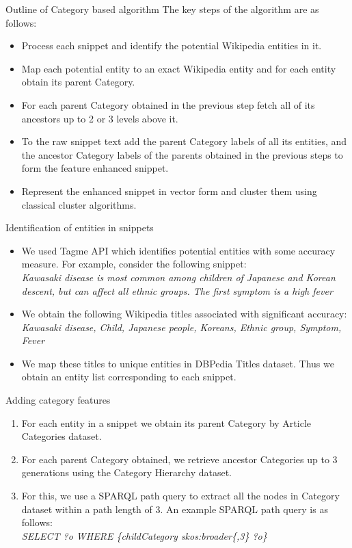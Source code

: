 \documentclass{beamer}
\begin{document}
\begin{frame}{Outline of Category based algorithm}
 The key steps of the algorithm are as follows:
\begin{itemize}
  \item Process each snippet and identify the potential Wikipedia
    entities in it.
  \item Map each potential entity to an exact Wikipedia entity and for
    each entity obtain its parent Category.
  \item For each parent Category obtained in the previous step fetch
    all of its ancestors up to 2 or 3 levels above it.
  \item To the raw snippet text add the parent Category labels of all its
    entities, and the ancestor Category labels of the parents obtained
    in the previous steps to form the feature enhanced snippet.
  \item Represent the enhanced snippet in vector form and cluster them
    using classical cluster algorithms.
\end{itemize}
\end{frame}

\begin{frame}[fragile]{Identification of entities in snippets}
\begin{itemize}
  \item We used Tagme API\cite{tagme} which identifies potential
    entities with some accuracy measure. For example, consider the
    following snippet: \\ {\it Kawasaki disease is most common among
      children of Japanese and Korean descent, but can affect all
      ethnic groups. The first symptom is a high fever }
 \item We obtain the following Wikipedia titles associated with
   significant accuracy: \\ {\it Kawasaki disease, Child,
     Japanese people, Koreans, Ethnic group, Symptom, Fever }
 \item We map these titles to unique entities in
DBPedia Titles dataset. Thus we obtain an entity list corresponding to
each snippet.
\end{itemize}
\end{frame}

\begin{frame}{Adding category features}
\begin{enumerate}
  \item For each entity in a snippet we obtain its parent Category by
    Article Categories dataset. \\
  \item For each parent Category obtained, we retrieve ancestor
    Categories up to 3 generations using the Category
    Hierarchy dataset. \\
  \item For this, we use a SPARQL path query to extract all the
    nodes in Category dataset within a path length of 3. An example
    SPARQL path query is as follows: \\
    {\it SELECT ?o WHERE \{childCategory skos:broader\{,3\}  ?o\}}
\end{enumerate}
\end{frame}
\end{document}
